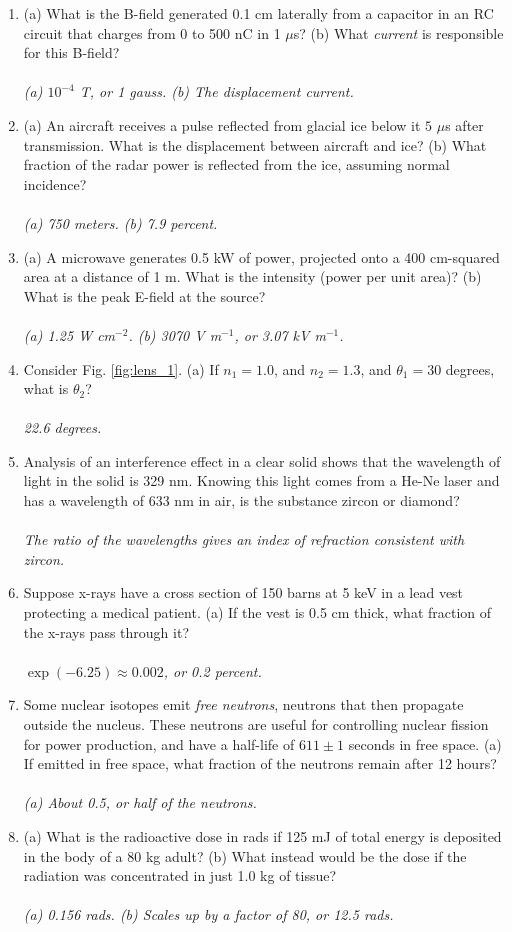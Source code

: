 \documentclass[12pt,twocolumn]{article}
\begin{document}
\noindent
\begin{enumerate}
\item (a) What is the B-field generated 0.1 cm laterally from a capacitor in an RC circuit that charges from 0 to 500 nC in 1 $\mu$s? (b) What \textit{current} is responsible for this B-field? \\ \\
\textit{(a) $10^{-4}$ T, or 1 gauss. (b) The displacement current.}
\item (a) An aircraft receives a pulse reflected from glacial ice below it $5$ $\mu$s after transmission. What is the displacement between aircraft and ice? (b) What fraction of the radar power is reflected from the ice, assuming normal incidence? \\ \\
\textit{(a) 750 meters. (b) 7.9 percent.}
\item (a) A microwave generates 0.5 kW of power, projected onto a 400 cm-squared area at a distance of 1 m.  What is the intensity (power per unit area)? (b) What is the peak E-field at the source? \\ \\
\textit{(a) 1.25 W cm$^{-2}$. (b) 3070 V m$^{-1}$, or 3.07 kV m$^{-1}$.}
\item Consider Fig. \ref{fig:lens_1}.  (a) If $n_1 = 1.0$, and $n_2 = 1.3$, and $\theta_1 = 30$ degrees, what is $\theta_2$? \\ \\
\textit{22.6 degrees.}
\item Analysis of an interference effect in a clear solid shows that the wavelength of light in the solid is 329 nm. Knowing this light comes from a He-Ne laser and has a wavelength of 633 nm in air, is the substance zircon or diamond?  \\ \\
\textit{The ratio of the wavelengths gives an index of refraction consistent with zircon.}
\item Suppose x-rays have a cross section of 150 barns at 5 keV in a lead vest protecting a medical patient. (a) If the vest is 0.5 cm thick, what fraction of the x-rays pass through it? \\ \\
\textit{$\exp(-6.25) \approx 0.002$, or 0.2 percent.}
\item Some nuclear isotopes emit \textit{free neutrons}, neutrons that then propagate outside the nucleus.  These neutrons are useful for controlling nuclear fission for power production, and have a half-life of $611\pm 1$ seconds in free space.  (a) If emitted in free space, what fraction of the neutrons remain after 12 hours? \\ \\
\textit{(a) About 0.5, or half of the neutrons.}
\item (a) What is the radioactive dose in rads if 125 mJ of total energy is deposited in the body of a 80 kg adult? (b) What instead would be the dose if the radiation was concentrated in just 1.0 kg of tissue? \\ \\
\textit{(a) 0.156 rads. (b) Scales up by a factor of 80, or 12.5 rads.}
\end{enumerate}
\end{document}
